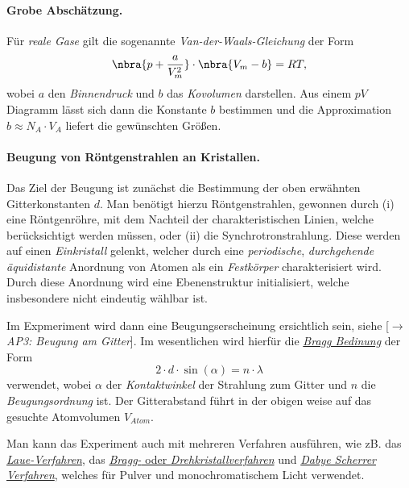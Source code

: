 \documentclass{subfiles}
\begin{document}
            \paragraph*{Grobe Abschätzung.} Für \emph{reale Gase} gilt die sogenannte \emph{Van-der-Waals-Gleichung} der Form
            \[
                \nbra{p+\frac{a}{V_m^2}}\cdot\nbra{V_m-b}=RT,
            \]
            wobei $a$ den \emph{Binnendruck} und $b$ das \emph{Kovolumen} darstellen. Aus einem $pV$ Diagramm lässt sich dann die Konstante $b$ bestimmen und die Approximation $b\approx N_A\cdot V_A$ liefert die gewünschten Größen.

            \paragraph*{Beugung von Röntgenstrahlen an Kristallen.}
            Das Ziel der Beugung ist zunächst die Bestimmung der oben erwähnten Gitterkonstanten $d$. Man benötigt hierzu Röntgenstrahlen, gewonnen durch (i) eine Röntgenröhre, mit dem Nachteil der charakteristischen Linien, welche berücksichtigt werden müssen, oder (ii) die Synchrotronstrahlung. Diese werden auf einen \emph{Einkristall} gelenkt, welcher durch eine \emph{periodische}, \emph{durchgehende äquidistante} Anordnung von Atomen als ein \emph{Festkörper} charakterisiert wird. Durch diese Anordnung wird eine Ebenenstruktur initialisiert, welche insbesondere nicht eindeutig wählbar ist. 

            Im Expmeriment wird dann eine Beugungserscheinung ersichtlich sein, siehe [$\to$ \emph{AP3: Beugung am Gitter}]. Im wesentlichen wird hierfür die \href{https://de.wikipedia.org/wiki/Bragg-Gleichung}{\emph{Bragg Bedinung}} der Form
            \[2\cdot d\cdot\sin(\alpha)=n\cdot \lambda\]
            verwendet, wobei $\alpha$ der \emph{Kontaktwinkel} der Strahlung zum Gitter und $n$ die \emph{Beugungsordnung} ist. Der Gitterabstand führt in der obigen weise auf das gesuchte Atomvolumen $V_\textit{Atom}$. 

            Man kann das Experiment auch mit mehreren Verfahren ausführen, wie zB. das \href{https://de.wikipedia.org/wiki/Laue-Verfahren}{\emph{Laue-Verfahren}}, das \href{https://de.wikipedia.org/wiki/Drehkristallmethode}{\emph{Bragg-} oder \emph{Drehkristallverfahren}} und \href{https://de.wikipedia.org/wiki/Debye-Scherrer-Verfahren}{\emph{Dabye Scherrer Verfahren}}, welches für Pulver und monochromatischem Licht verwendet. 
        
\end{document}
